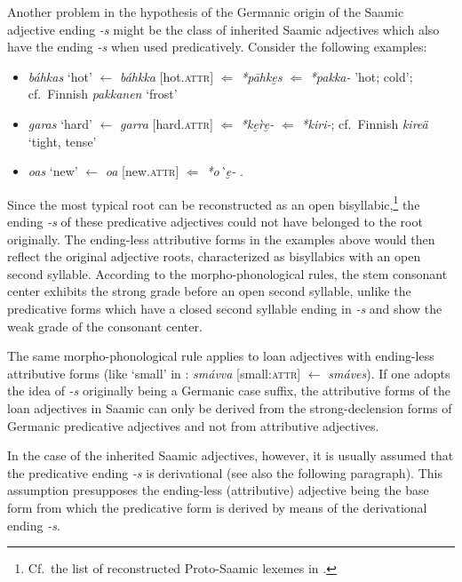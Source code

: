{Another problem in the hypothesis of the Germanic origin of the Saamic adjective ending \textit{-s} might be the class of inherited Saamic adjectives which also have the ending \textit{-s} when used predicatively. Consider the following examples:
\begin{itemize}
\item {} \textit{báhkas} ‘hot’ $\leftarrow$ \textit{báhkka} [hot.\textsc{attr}] $\Leftarrow$  \textit{*pāhke̮s} $\Leftarrow$  \textit{*pakka-} 'hot; cold’; cf.~Finnish \textit{pakkanen} ‘frost’ \citep[230]{sammallahti1998b}
\item {} \textit{garas} ‘hard’ $\leftarrow$ \textit{garra} [hard.\textsc{attr}] $\Leftarrow$  \textit{*ke̮\`re̮-} $\Leftarrow$  \textit{*kiri-}; cf.~Finnish \textit{kireä} ‘tight, tense’ \citep[242]{sammallahti1998b}
\item {} \textit{o{\dj}as} ‘new’ $\leftarrow$ \textit{o{\dj}{\dj}a} [new.\textsc{attr}] $\Leftarrow$  \textit{*o\`{\dh}e̮-} \citep[258]{sammallahti1998b}.
\end{itemize}
Since the most typical  root can be reconstructed as an open bisyllabic,\footnote{Cf.~the list of reconstructed Proto\hyp{}Saamic lexemes in \cite{lehtiranta1989}.} the ending \textit{-s} of these predicative adjectives could not have belonged to the root originally. The ending-less attributive forms in the examples above would then reflect the original adjective roots, characterized as bisyllabics with an open second syllable. According to the  morpho-phonological rules, the stem consonant center exhibits the strong grade before an open second syllable, unlike the predicative forms which have a closed second syllable ending in \textit{-s} and show the weak grade of the consonant center.

The same morpho-phonological rule applies to loan adjectives with ending-less attributive forms (like ‘small’ in : \textit{smávva} [small:\textsc{attr}] $\leftarrow$ \textit{smáves}). If one adopts the idea of \textit{-s} originally being a Germanic case suffix, the attributive forms of the loan adjectives in Saamic can only be derived from the strong-declension forms of Germanic predicative adjectives and not from attributive adjectives.

In the case of the inherited Saamic adjectives, however, it is usually assumed that the predicative ending \textit{-s} is derivational (see also the following paragraph). This assumption presupposes the ending-less (attributive) adjective being the base form from which the predicative form is derived by means of the derivational ending \textit{-s}. %

}
